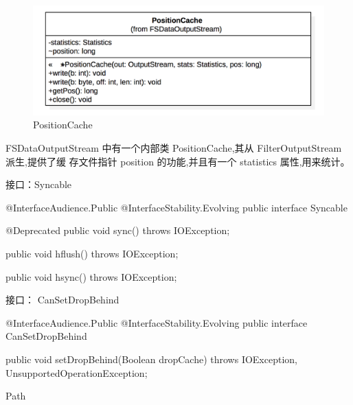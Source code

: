 \begin{figure}[h]
\centering
\includegraphics[width =1\linewidth]{3.png}
\caption{PositionCache}
\label{fig:PositionCache}
\end{figure}

FSDataOutputStream 中有一个内部类 PositionCache,其从 FilterOutputStream 派生,提供了缓
存文件指针 position 的功能,并且有一个 statistics 属性,用来统计。


接口：Syncable


\begin{java}
	@InterfaceAudience.Public
	@InterfaceStability.Evolving
	public interface Syncable {

	  @Deprecated
	  public void sync() throws IOException;

	  public void hflush() throws IOException;

	  public void hsync() throws IOException;
	}
\end{java}
接口：	CanSetDropBehind
\begin{java}
	@InterfaceAudience.Public
	@InterfaceStability.Evolving
	public interface CanSetDropBehind {

	  public void setDropBehind(Boolean dropCache)
	      throws IOException, UnsupportedOperationException;
	}
\end{java}


Path

